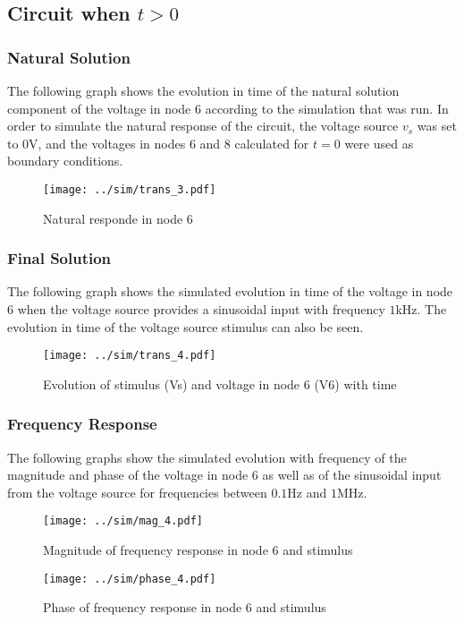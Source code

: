 \subsection{Circuit when $t>0$}

\subsubsection{Natural Solution}

The following graph shows the evolution in time of the natural solution component of the voltage in node 6 according to the simulation that was run. In order to simulate the natural response of the circuit, the voltage source $v_s$ was set to $0$V, and the voltages in nodes 6 and 8 calculated for $t=0$ were used as boundary conditions.

\begin{figure}[h] \centering
\texttt{[image: ../sim/trans\_3.pdf]}
\caption{Natural responde in node 6}
\label{fig:natural_sim}
\end{figure}

\subsubsection{Final Solution}

The following graph shows the simulated evolution in time of the voltage in node 6 when the voltage source provides a sinusoidal input with frequency $1$kHz. The evolution in time of the voltage source stimulus can also be seen.

\begin{figure}[h] \centering
\texttt{[image: ../sim/trans\_4.pdf]}
\caption{Evolution of stimulus (Vs) and voltage in node 6 (V6) with time}
\label{fig:final_sim}
\end{figure}

\subsubsection{Frequency Response}

The following graphs show the simulated evolution with frequency of the magnitude and phase of the voltage in node 6 as well as of the sinusoidal input from the voltage source for frequencies between $0.1$Hz and $1$MHz.

\begin{figure}[h] \centering
\texttt{[image: ../sim/mag\_4.pdf]}
\caption{Magnitude of frequency response in node 6 and stimulus}
\label{fig:mag_sim}
\end{figure}


\begin{figure}[h] \centering
\texttt{[image: ../sim/phase\_4.pdf]}
\caption{Phase of frequency response in node 6 and stimulus}
\label{fig:phase_sim}
\end{figure}
